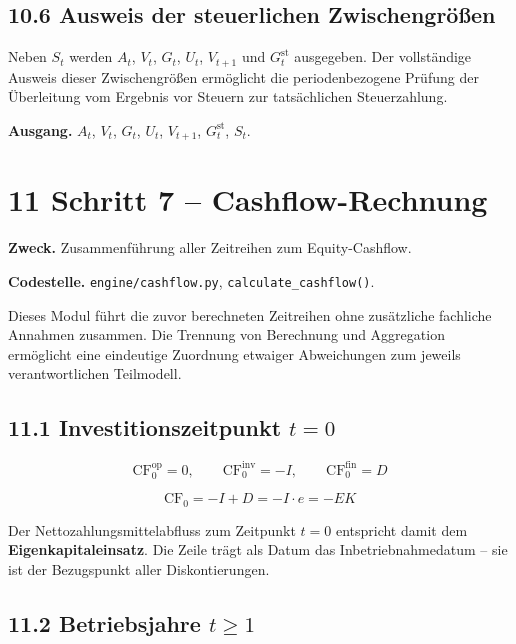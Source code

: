 \documentclass[
  a4paper,
  10pt]{article}
\begin{document}
\hypertarget{ausweis-der-steuerlichen-zwischengruxf6uxdfen}{%
\subsection{10.6 Ausweis der steuerlichen
Zwischengrößen}\label{ausweis-der-steuerlichen-zwischengruxf6uxdfen}}

Neben \(S_t\) werden \(A_t\), \(V_t\), \(G_t\), \(U_t\), \(V_{t+1}\) und
\(G^{\mathrm{st}}_t\) ausgegeben. Der vollständige Ausweis dieser
Zwischengrößen ermöglicht die periodenbezogene Prüfung der Überleitung
vom Ergebnis vor Steuern zur tatsächlichen Steuerzahlung.

\textbf{Ausgang.} \(A_t\), \(V_t\), \(G_t\), \(U_t\), \(V_{t+1}\),
\(G^{\mathrm{st}}_t\), \(S_t\).

\hypertarget{schritt-7-cashflow-rechnung}{%
\section{11 Schritt 7 --
Cashflow-Rechnung}\label{schritt-7-cashflow-rechnung}}

\textbf{Zweck.} Zusammenführung aller Zeitreihen zum Equity-Cashflow.

\textbf{Codestelle.} \nolinkurl{engine/cashflow.py},
\texttt{calculate\_cashflow()}.

Dieses Modul führt die zuvor berechneten Zeitreihen ohne zusätzliche
fachliche Annahmen zusammen. Die Trennung von Berechnung und Aggregation
ermöglicht eine eindeutige Zuordnung etwaiger Abweichungen zum jeweils
verantwortlichen Teilmodell.

\hypertarget{investitionszeitpunkt-t-0}{%
\subsection{\texorpdfstring{11.1 Investitionszeitpunkt
\(t = 0\)}{11.1 Investitionszeitpunkt t = 0}}\label{investitionszeitpunkt-t-0}}

\[ \mathrm{CF}^{\mathrm{op}}_0 = 0, \qquad \mathrm{CF}^{\mathrm{inv}}_0 = -I, \qquad \mathrm{CF}^{\mathrm{fin}}_0 = D \]

\[ \mathrm{CF}_0 = -I + D = -I \cdot e = -EK \]

Der Nettozahlungsmittelabfluss zum Zeitpunkt \(t=0\) entspricht damit
dem \textbf{Eigenkapitaleinsatz}. Die Zeile trägt als Datum das
Inbetriebnahmedatum -- sie ist der Bezugspunkt aller Diskontierungen.

\hypertarget{betriebsjahre-t-geq-1}{%
\subsection{\texorpdfstring{11.2 Betriebsjahre
\(t \geq 1\)}{11.2 Betriebsjahre t \textbackslash geq 1}}\label{betriebsjahre-t-geq-1}}
\end{document}
